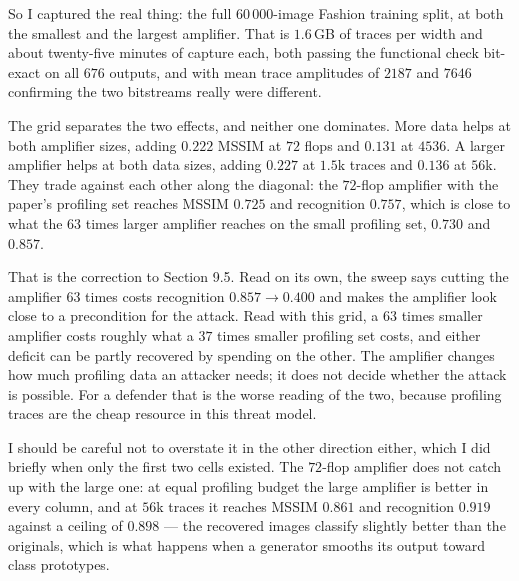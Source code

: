 \documentclass[11pt,a4paper]{article}
\begin{document}
So I captured the real thing: the full $60\,000$-image Fashion training split, at both the
smallest and the largest amplifier. That is $1.6$\,GB of traces per width and about
twenty-five minutes of capture each, both passing the functional check bit-exact on all
$676$ outputs, and with mean trace amplitudes of $2187$ and $7646$ confirming the two
bitstreams really were different.

\begin{table}[h]
  \centering
  \small
  \resizebox{\textwidth}{!}{}
  \caption{Amplifier size against profiling-set size. Identical loss, batch, epochs,
  split and seed in every cell. The zero-amplifier row is measured in Section 9.7; the
  four amplified cells are the ones discussed here.}
  \label{tab:ampdata}
\end{table}

The grid separates the two effects, and neither one dominates. More data helps at both
amplifier sizes, adding $0.222$ MSSIM at $72$ flops and $0.131$ at $4536$. A larger
amplifier helps at both data sizes, adding $0.227$ at $1.5$k traces and $0.136$ at $56$k.
They trade against each other along the diagonal: the $72$-flop amplifier with the paper's
profiling set reaches MSSIM $0.725$ and recognition $0.757$, which is close to what the
$63$ times larger amplifier reaches on the small profiling set, $0.730$ and $0.857$.

That is the correction to Section 9.5. Read on its own, the sweep says cutting the
amplifier $63$ times costs recognition $0.857 \to 0.400$ and makes the amplifier look
close to a precondition for the attack. Read with this grid, a $63$ times smaller
amplifier costs roughly what a $37$ times smaller profiling set costs, and either deficit
can be partly recovered by spending on the other. The amplifier changes how much
profiling data an attacker needs; it does not decide whether the attack is possible. For a
defender that is the worse reading of the two, because profiling traces are the cheap
resource in this threat model.

I should be careful not to overstate it in the other direction either, which I did briefly
when only the first two cells existed. The $72$-flop amplifier does not catch up with the
large one: at equal profiling budget the large amplifier is better in every column, and at
$56$k traces it reaches MSSIM $0.861$ and recognition $0.919$ against a ceiling of $0.898$
--- the recovered images classify slightly better than the originals, which is what
happens when a generator smooths its output toward class prototypes.
\end{document}

